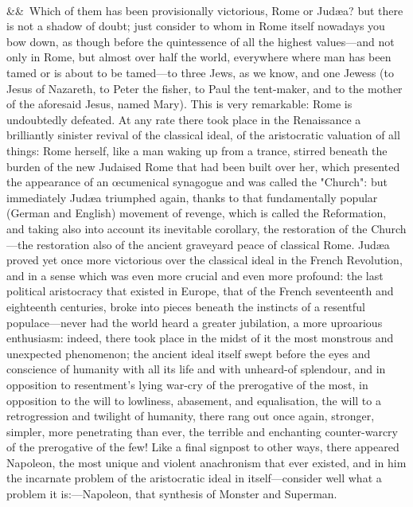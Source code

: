 \documentclass[12pt]{article}
\newcommand{\para}[1][]{\par\noindent\ifx&#1&\else\textsuperscript{\footnotesize #1}~\fi}
\begin{document}
\para Which of them has been provisionally victorious, Rome or Judæa? but there is not a shadow of doubt; just consider to whom in Rome itself nowadays you bow down, as though before the quintessence of all the highest values---and not only in Rome, but almost over half the world, everywhere where man has been tamed or is about to be tamed---to three Jews, as we know, and one Jewess (to Jesus of Nazareth, to Peter the fisher, to Paul the tent-maker, and to the mother of the aforesaid Jesus, named Mary). This is very remarkable: Rome is undoubtedly defeated. At any rate there took place in the Renaissance a brilliantly sinister revival of the classical ideal, of the aristocratic valuation of all things: Rome herself, like a man waking up from a trance, stirred beneath the burden of the new Judaised Rome that had been built over her, which presented the appearance of an œcumenical synagogue and was called the "Church": but immediately Judæa triumphed again, thanks to that fundamentally popular (German and English) movement of revenge, which is called the Reformation, and taking also into account its inevitable corollary, the restoration of the Church---the restoration also of the ancient graveyard peace of classical Rome. Judæa proved yet once more victorious over the classical ideal in the French Revolution, and in a sense which was even more crucial and even more profound: the last political aristocracy that existed in Europe, that of the French seventeenth and eighteenth centuries, broke into pieces beneath the instincts of a resentful populace---never had the world heard a greater jubilation, a more uproarious enthusiasm: indeed, there took place in the midst of it the most monstrous and unexpected phenomenon; the ancient ideal itself swept before the eyes and conscience of humanity with all its life and with unheard-of splendour, and in opposition to resentment's lying war-cry of the prerogative of the most, in opposition to the will to lowliness, abasement, and equalisation, the will to a retrogression and twilight of humanity, there rang out once again, stronger, simpler, more penetrating than ever, the terrible and enchanting counter-warcry of the prerogative of the few! Like a final signpost to other ways, there appeared Napoleon, the most unique and violent anachronism that ever existed, and in him the incarnate problem of the aristocratic ideal in itself---consider well what a problem it is:---Napoleon, that synthesis of Monster and Superman.
\end{document}
